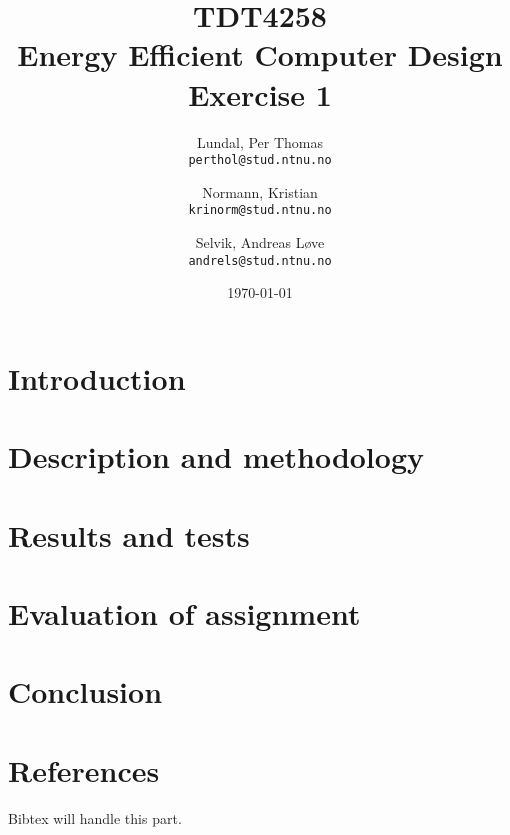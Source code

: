 \documentclass[a4paper,12pt]{article}
\title{TDT4258\\ Energy Efficient Computer Design
	\\Exercise 1}
\author{
    Lundal, Per Thomas\\
    \texttt{perthol@stud.ntnu.no}
    \and
    Normann, Kristian\\
    \texttt{krinorm@stud.ntnu.no}
    \and
    Selvik, Andreas Løve\\
    \texttt{andrels@stud.ntnu.no}
}
\date{\today}
\begin{document}
\maketitle

\clearpage
\begin{abstract}
    
\end{abstract}

\clearpage
\tableofcontents

\clearpage
\section{Introduction}
    

\clearpage
\section{Description and methodology}
    

\clearpage
\section{Results and tests}
    

\clearpage
\section{Evaluation of assignment}
    

\clearpage
\section{Conclusion}
    

\clearpage
\section{References}

Bibtex will handle this part.
\end{document}

